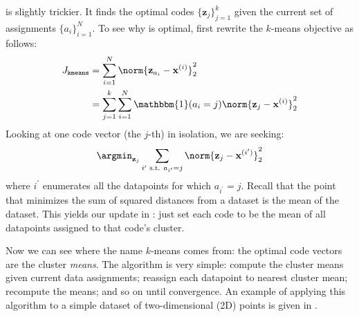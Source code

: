 \Eqn{\ref{eqn:representation_learning:kmeans_update_means}} is slightly trickier. It finds the optimal codes $\{\mathbf{z}_j\}_{j=1}^k$ given the current set of assignments $\{a_i\}_{i=1}^N$. To see why \eqn{\ref{eqn:representation_learning:kmeans_update_means}} is optimal, first rewrite the $k$-means objective as follows:
\begin{align}
    J_{\texttt{kmeans}} & = \sum_{i=1}^N \norm{\mathbf{z}_{a_i} - \mathbf{x}^{(i)}}^2_2                               \\
                        & = \sum_{j=1}^k \sum_{i=1}^N \mathbbm{1}(a_i = j) \norm{\mathbf{z}_j - \mathbf{x}^{(i)}}^2_2
\end{align}
Looking at one code vector (the $j$-th) in isolation, we are seeking:
\begin{align}
    \argmin_{\mathbf{z}_j} \sum_{i^{\prime} \text{ s.t. } a_{i^\prime}=j} \norm{\mathbf{z}_j - \mathbf{x}^{(i^{\prime})}}^2_2
\end{align}
where $i^{\prime}$ enumerates all the datapoints for which $a_{i^\prime} = j$. Recall that the point that minimizes the sum of squared distances from a dataset is the mean of the dataset. This yields our update in \eqn{\ref{eqn:representation_learning:kmeans_update_means}}: just set each code to be the mean of all datapoints assigned to that code's cluster.

Now we can see where the name $k$-means comes from: the optimal code vectors are the cluster \textit{means}. The algorithm is very simple: compute the cluster means given current data assignments; reassign each datapoint to nearest cluster mean; recompute the means; and so on until convergence. An example of applying this algorithm to a simple dataset of two-dimensional (2D) points is given in \fig{\ref{fig:representation_learning:kmeans_ex}}.

